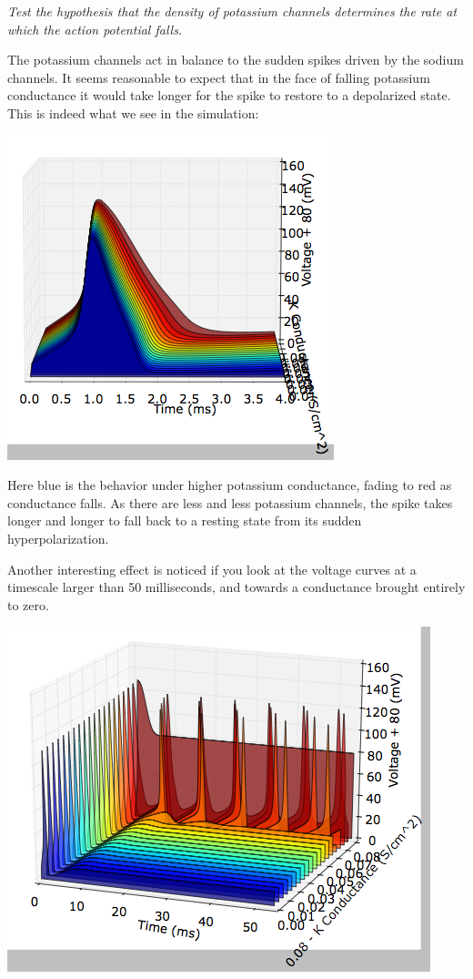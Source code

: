 \documentclass[12pt]{article}
\begin{document}
\emph{Test the hypothesis that the density of potassium channels determines the rate at which the action potential falls.}

\vspace{10pt}

The potassium channels act in balance to the sudden spikes driven by the sodium channels.  It seems reasonable to expect that in the face of falling potassium conductance it would take longer for the spike to restore to a depolarized state.  This is indeed what we see in the simulation:

\includegraphics[scale=0.6]{kconductance.png}

Here blue is the behavior under higher potassium conductance, fading to red as conductance falls.  As there are less and less potassium channels, the spike takes longer and longer to fall back to a resting state from its sudden hyperpolarization.

Another interesting effect is noticed if you look at the voltage curves at a timescale larger than 50 milliseconds, and towards a conductance brought entirely to zero.  

\includegraphics[scale=0.6]{kconductance-largescale.png}
\end{document}
